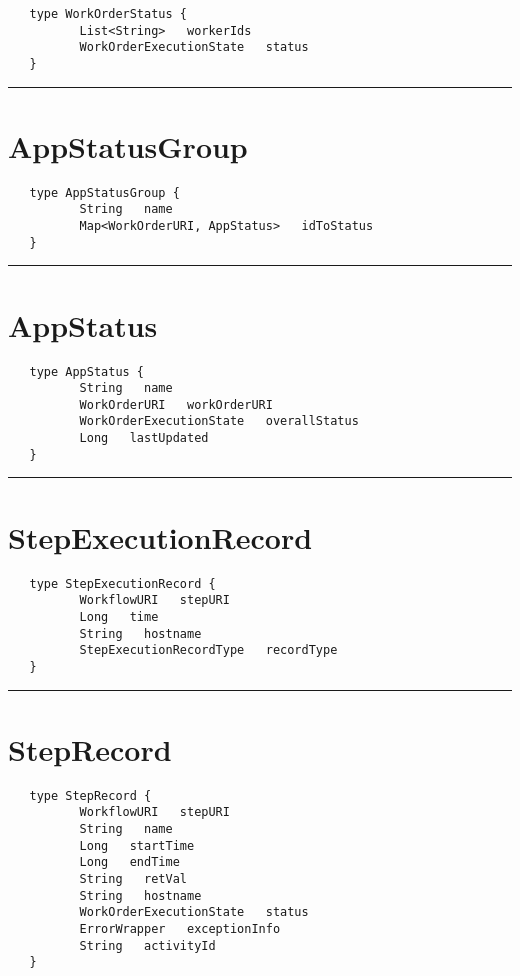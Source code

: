 \begin{verbatim}
   type WorkOrderStatus {
          List<String>   workerIds
          WorkOrderExecutionState   status
   }
\end{verbatim}

\rule{12cm}{2pt}
\section{AppStatusGroup}
\label{type:AppStatusGroup}

\begin{verbatim}
   type AppStatusGroup {
          String   name
          Map<WorkOrderURI, AppStatus>   idToStatus
   }
\end{verbatim}

\rule{12cm}{2pt}
\section{AppStatus}
\label{type:AppStatus}

\begin{verbatim}
   type AppStatus {
          String   name
          WorkOrderURI   workOrderURI
          WorkOrderExecutionState   overallStatus
          Long   lastUpdated
   }
\end{verbatim}

\rule{12cm}{2pt}
\section{StepExecutionRecord}
\label{type:StepExecutionRecord}

\begin{verbatim}
   type StepExecutionRecord {
          WorkflowURI   stepURI
          Long   time
          String   hostname
          StepExecutionRecordType   recordType
   }
\end{verbatim}

\rule{12cm}{2pt}
\section{StepRecord}
\label{type:StepRecord}

\begin{verbatim}
   type StepRecord {
          WorkflowURI   stepURI
          String   name
          Long   startTime
          Long   endTime
          String   retVal
          String   hostname
          WorkOrderExecutionState   status
          ErrorWrapper   exceptionInfo
          String   activityId
   }
\end{verbatim}

